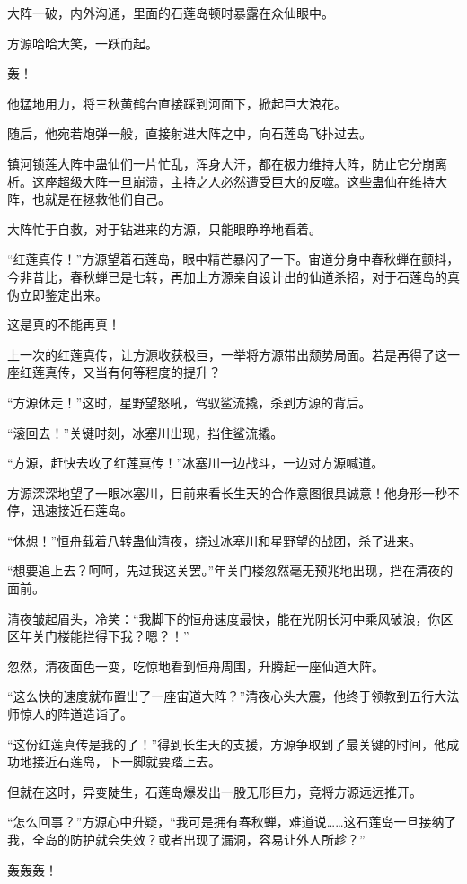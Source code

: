 \begin{this_body}
大阵一破，内外沟通，里面的石莲岛顿时暴露在众仙眼中。

方源哈哈大笑，一跃而起。

轰！

他猛地用力，将三秋黄鹤台直接踩到河面下，掀起巨大浪花。

随后，他宛若炮弹一般，直接射进大阵之中，向石莲岛飞扑过去。

镇河锁莲大阵中蛊仙们一片忙乱，浑身大汗，都在极力维持大阵，防止它分崩离析。这座超级大阵一旦崩溃，主持之人必然遭受巨大的反噬。这些蛊仙在维持大阵，也就是在拯救他们自己。

大阵忙于自救，对于钻进来的方源，只能眼睁睁地看着。

“红莲真传！”方源望着石莲岛，眼中精芒暴闪了一下。宙道分身中春秋蝉在颤抖，今非昔比，春秋蝉已是七转，再加上方源亲自设计出的仙道杀招，对于石莲岛的真伪立即鉴定出来。

这是真的不能再真！

上一次的红莲真传，让方源收获极巨，一举将方源带出颓势局面。若是再得了这一座红莲真传，又当有何等程度的提升？

“方源休走！”这时，星野望怒吼，驾驭鲨流撬，杀到方源的背后。

“滚回去！”关键时刻，冰塞川出现，挡住鲨流撬。

“方源，赶快去收了红莲真传！”冰塞川一边战斗，一边对方源喊道。

方源深深地望了一眼冰塞川，目前来看长生天的合作意图很具诚意！他身形一秒不停，迅速接近石莲岛。

“休想！”恒舟载着八转蛊仙清夜，绕过冰塞川和星野望的战团，杀了进来。

“想要追上去？呵呵，先过我这关罢。”年关门楼忽然毫无预兆地出现，挡在清夜的面前。

清夜皱起眉头，冷笑：“我脚下的恒舟速度最快，能在光阴长河中乘风破浪，你区区年关门楼能拦得下我？嗯？！”

忽然，清夜面色一变，吃惊地看到恒舟周围，升腾起一座仙道大阵。

“这么快的速度就布置出了一座宙道大阵？”清夜心头大震，他终于领教到五行大法师惊人的阵道造诣了。

“这份红莲真传是我的了！”得到长生天的支援，方源争取到了最关键的时间，他成功地接近石莲岛，下一脚就要踏上去。

但就在这时，异变陡生，石莲岛爆发出一股无形巨力，竟将方源远远推开。

“怎么回事？”方源心中升疑，“我可是拥有春秋蝉，难道说……这石莲岛一旦接纳了我，全岛的防护就会失效？或者出现了漏洞，容易让外人所趁？”

轰轰轰！


\end{this_body}
